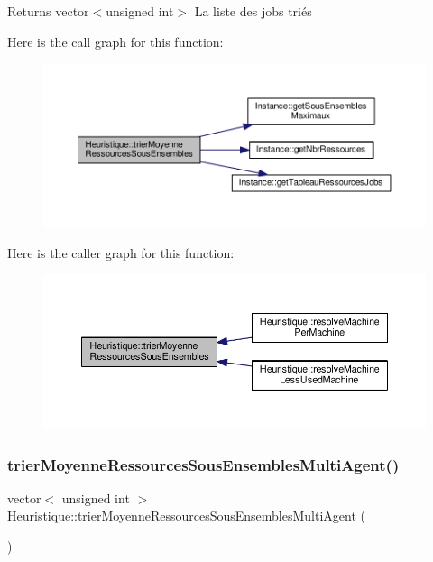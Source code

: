 \begin{DoxyReturn}{Returns}
vector$<$unsigned int$>$ La liste des jobs triés 
\end{DoxyReturn}
Here is the call graph for this function\+:
\nopagebreak
\begin{figure}[H]
\begin{center}
\leavevmode
\includegraphics[width=350pt]{classHeuristique_a4541884c49c13e08ee6c73c919388fd3_cgraph}
\end{center}
\end{figure}
Here is the caller graph for this function\+:
\nopagebreak
\begin{figure}[H]
\begin{center}
\leavevmode
\includegraphics[width=350pt]{classHeuristique_a4541884c49c13e08ee6c73c919388fd3_icgraph}
\end{center}
\end{figure}
\mbox{\label{classHeuristique_a7dcb7f68553d90195c39950ed456e266}} 
\subsubsection{\texorpdfstring{trier\+Moyenne\+Ressources\+Sous\+Ensembles\+Multi\+Agent()}{trierMoyenneRessourcesSousEnsemblesMultiAgent()}}
{\footnotesize\ttfamily vector$<$ unsigned int $>$ Heuristique\+::trier\+Moyenne\+Ressources\+Sous\+Ensembles\+Multi\+Agent (\begin{DoxyParamCaption}{ }\end{DoxyParamCaption})}



